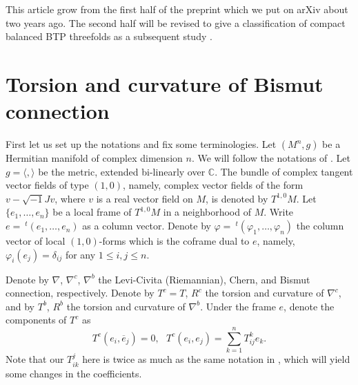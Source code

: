 \documentclass{amsart}
\numberwithin{equation}{section}
\theoremstyle{definition}
\renewcommand{\1}{\mathds{1}}
\renewcommand{\>}{\rightarrow}
\begin{document}
This article grow from the first half of the preprint \cite{ZhaoZ22} which we put on arXiv about two years ago.
The second half will be revised to give a classification of compact balanced BTP threefolds as a subsequent study \cite{ZhaoZ25}.




\vspace{0.4cm}

\section{Torsion and curvature of Bismut connection}\label{PRE}

First let us set up the notations and fix some terminologies. Let $(M^n,g)$ be a Hermitian manifold of complex dimension $n$.
We will follow the notations of  \cite{YZ18Cur,YZ18Gau,ZhaoZ19Str, Zheng, Zheng1}. Let $g = \langle , \rangle $ be the metric, extended bi-linearly over ${\mathbb C}$.
The bundle of complex tangent vector fields of type $(1,0)$, namely, complex vector fields of the form $v- \sqrt{-1}Jv$, where $v$ is a real vector field on $M$, is denoted by $T^{1,0}M$.
Let $\{ e_1, \ldots , e_n\}$ be a local frame of $T^{1,0}M$ in a neighborhood of $M$. Write $e=\ ^t\!(e_1, \ldots , e_n) $ as a column vector.
Denote by $\varphi = \ ^t\!(\varphi_1, \ldots ,  \varphi_n)$ the column vector of local $(1,0)$-forms which is the coframe dual to $e$, namely, $\varphi_i(e_j)=\delta_{ij}$ for any $1\leq i,j\leq n$.

Denote by $\nabla$, $\nabla^c$, $\nabla^b$ the Levi-Civita (Riemannian), Chern, and Bismut connection, respectively. Denote by $T^c=T$, $R^c$ the torsion and curvature of $\nabla^c$, and by $T^b$, $R^b$ the torsion and curvature of $\nabla^b$. Under the frame $e$, denote the components of $T^c$ as
\begin{equation}
T^c(e_i, \overline{e}_j)=0, \ \ \ T^c(e_i, e_j) =  \sum_{k=1}^n T^k_{ij} e_k.  \label{eq:2.1}
\end{equation}
Note that our $T^j_{ik}$ here is twice as much as the same notation in \cite{YZ18Cur, ZhaoZ19Str},
which will yield some changes in the coefficients.
\end{document}
